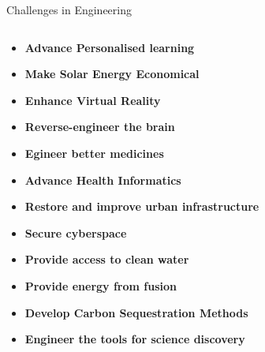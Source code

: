 \documentclass[xcolor={dvipsnames},aspectratio=169,10pt]{beamer}
\begin{document}
\begin{frame}{Challenges in Engineering}

  \begin{columns}
    \begin{column}{.7\linewidth}
 
  \begin{itemize}
    \item \textbf{Advance Personalised learning}
    \item \textbf{Make Solar Energy Economical}
    \item \textbf{Enhance Virtual Reality}
    \item \textbf{Reverse-engineer the brain}
    \item \textbf{Egineer better medicines}
    \item \textbf{Advance Health Informatics}
    \item \textbf{Restore and improve urban infrastructure}
    \item \textbf{Secure cyberspace}
    \item \textbf{Provide access to clean water}
    \item \textbf{Provide energy from fusion}
    \item \textbf{Develop Carbon Sequestration Methods}
    \item \textbf{Engineer the tools for science discovery}
  \end{itemize}

    \end{column}
  


  \begin{column}{.3\linewidth}


\end{column}
\end{columns}
\end{frame}
\end{document}
